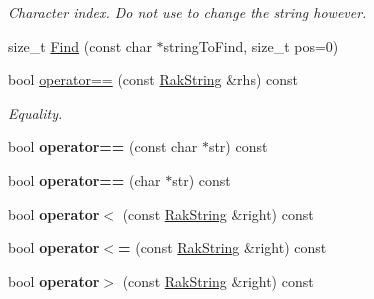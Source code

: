 \begin{DoxyCompactItemize}
\begin{DoxyCompactList}\small\item\em Character index. Do not use to change the string however. \end{DoxyCompactList}\item 
size\-\_\-t \hyperlink{class_rak_net_1_1_rak_string_a0516f3513b09234ea392419ca8344045}{Find} (const char $\ast$string\-To\-Find, size\-\_\-t pos=0)
\item 
\hypertarget{class_rak_net_1_1_rak_string_a8a34592015f4dbedb01084bf592f146b}{bool \hyperlink{class_rak_net_1_1_rak_string_a8a34592015f4dbedb01084bf592f146b}{operator==} (const \hyperlink{class_rak_net_1_1_rak_string}{Rak\-String} \&rhs) const }\label{class_rak_net_1_1_rak_string_a8a34592015f4dbedb01084bf592f146b}

\begin{DoxyCompactList}\small\item\em Equality. \end{DoxyCompactList}\item 
\hypertarget{class_rak_net_1_1_rak_string_a1e4a2f6ec253be7d2772a3b54dafe4e2}{bool {\bfseries operator==} (const char $\ast$str) const }\label{class_rak_net_1_1_rak_string_a1e4a2f6ec253be7d2772a3b54dafe4e2}

\item 
\hypertarget{class_rak_net_1_1_rak_string_abb078be5778b7ac1668ae364ad3cb514}{bool {\bfseries operator==} (char $\ast$str) const }\label{class_rak_net_1_1_rak_string_abb078be5778b7ac1668ae364ad3cb514}

\item 
\hypertarget{class_rak_net_1_1_rak_string_ae49b79e997d93c7fa9193bcb6e8b9b2a}{bool {\bfseries operator$<$} (const \hyperlink{class_rak_net_1_1_rak_string}{Rak\-String} \&right) const }\label{class_rak_net_1_1_rak_string_ae49b79e997d93c7fa9193bcb6e8b9b2a}

\item 
\hypertarget{class_rak_net_1_1_rak_string_ac8fc2ed59ef5cc7ca25fd1bf557b9e44}{bool {\bfseries operator$<$=} (const \hyperlink{class_rak_net_1_1_rak_string}{Rak\-String} \&right) const }\label{class_rak_net_1_1_rak_string_ac8fc2ed59ef5cc7ca25fd1bf557b9e44}

\item 
\hypertarget{class_rak_net_1_1_rak_string_a8ce6d4939075f5fae8ee903c585d784e}{bool {\bfseries operator$>$} (const \hyperlink{class_rak_net_1_1_rak_string}{Rak\-String} \&right) const }\label{class_rak_net_1_1_rak_string_a8ce6d4939075f5fae8ee903c585d784e}


\end{DoxyCompactItemize}
